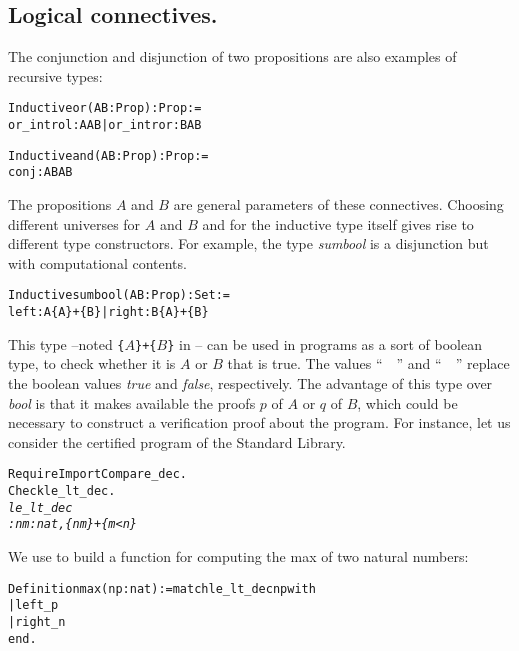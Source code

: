 \documentclass[11pt]{article}
\begin{document}
\subsection{Logical connectives.} \label{LogicalConnectives}
The conjunction and disjunction of two propositions are also examples
of recursive types:

\begin{alltt}
Inductive or (A B : Prop) : Prop :=
    or_introl : A \arrow{} A {\coqor} B | or_intror : B \arrow{} A {\coqor} B

Inductive and (A B : Prop) : Prop :=
    conj : A \arrow{} B \arrow{} A {\coqand} B

\end{alltt}

The propositions $A$ and $B$ are general parameters of these
connectives. Choosing different universes for
$A$ and $B$ and for the inductive type itself gives rise to different
type constructors. For example, the type \textsl{sumbool} is a
disjunction but with computational contents.

\begin{alltt}
Inductive sumbool (A B : Prop) : Set :=
    left : A \arrow{} \{A\} + \{B\} | right : B \arrow{} \{A\} + \{B\}
\end{alltt}



This type --noted \texttt{\{$A$\}+\{$B$\}} in {\coq}-- can be used in {\coq}
programs as a sort of boolean type, to check whether it is $A$ or $B$
that is true.  The values ``~~'' and
``~~'' replace the boolean values \textsl{true} and
\textsl{false}, respectively. The advantage of this type over
\textsl{bool} is that it makes available the proofs $p$ of $A$ or $q$
of $B$, which could be necessary to construct a verification proof
about the program.
For instance, let us consider the certified program 
of the Standard Library.

\begin{alltt}
Require Import Compare_dec.
Check le_lt_dec.
\it
le_lt_dec
     : {\prodsym} n m : nat, \{n {\coqle} m\} + \{m < n\}

\end{alltt}

We use  to build a function for computing
the max of two natural numbers:

\begin{alltt}
Definition max (n p :nat) := match le_lt_dec n p with
                             | left _ {\funarrow} p
                             | right _ {\funarrow} n
                             end.
\end{alltt}
\end{document}

